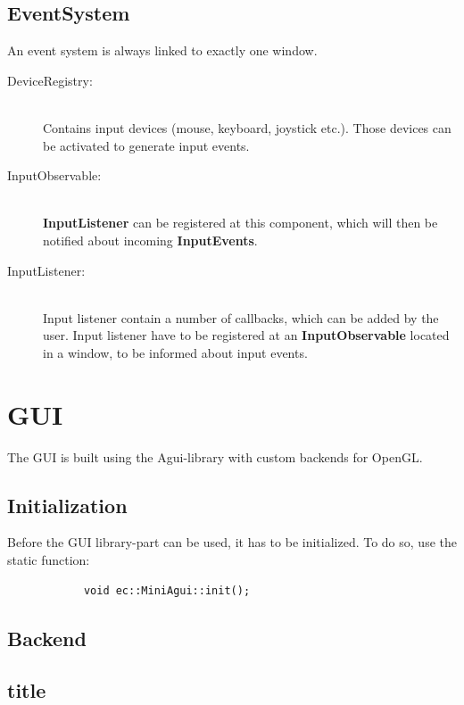 \documentclass[12p, paper=a4, leqno, colorinlistoftodos]{article}
\begin{document}
		\subsection{EventSystem}
		An event system is always linked to exactly one window. 
		\begin{description}
			\item[DeviceRegistry:] \hfill\\
				Contains input devices (mouse, keyboard, joystick etc.). Those devices can be activated to generate input events.
			\item[InputObservable:] \hfill\\
				\textbf{InputListener} can be registered at this component, which will then be notified about incoming \textbf{InputEvents}.
			\item[InputListener:] \hfill\\
				Input listener contain a number of callbacks, which can be added by the user. Input listener have to be registered at an \textbf{InputObservable} located in a window, to be informed about input events.	
		\end{description}
		
			
	
	\pagebreak
	\section{GUI}
	The GUI is built using the Agui-library with custom backends for OpenGL.
	
		\subsection{Initialization}
		Before the GUI library-part can be used, it has to be initialized. To do so, use the static function:
		\begin{lstlisting}
			void ec::MiniAgui::init();
		\end{lstlisting}
		
		\subsection{Backend}
		
		\subsection{title}
		
		
	\pagebreak
	
	
	
	
	\newpage
	\appendix
	\listoffigures
	\listoftables
	
	
\end{document}
